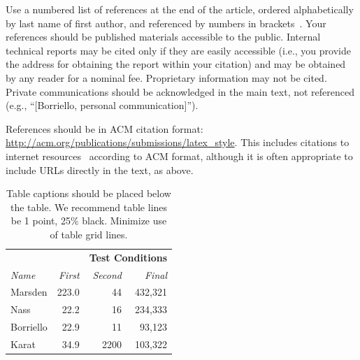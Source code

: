 \documentclass{sigchi}
\begin{document}
Use a numbered list of references at the end of the article, ordered
alphabetically by last name of first author, and referenced by numbers
in
brackets~\cite{Han:2005}.
Your references should be published materials accessible to the
public. Internal technical reports may be cited only if they are
easily accessible (i.e., you provide the address for obtaining the
report within your citation) and may be obtained by any reader for a
nominal fee. Proprietary information may not be cited. Private
communications should be acknowledged in the main text, not referenced
(e.g., ``[Borriello, personal communication]'').

References should be in ACM citation format:
\url{http://acm.org/publications/submissions/latex_style}. This
includes citations to internet
resources~\cite{Han:2005}
according to ACM format, although it is often appropriate to include
URLs directly in the text, as above.




\begin{table}
  \centering
  \begin{tabular}{l r r r}
    & & \multicolumn{2}{c}{\small{\textbf{Test Conditions}}} \\
    \cmidrule(r){3-4}
    {\small\textit{Name}}
    & {\small \textit{First}}
      & {\small \textit{Second}}
    & {\small \textit{Final}} \\
    \midrule
    Marsden & 223.0 & 44 & 432,321 \\
    Nass & 22.2 & 16 & 234,333 \\
    Borriello & 22.9 & 11 & 93,123 \\
    Karat & 34.9 & 2200 & 103,322 \\
  \end{tabular}
  \caption{Table captions should be placed below the table. We
    recommend table lines be 1 point, 25\% black. Minimize use of
    table grid lines.}~\label{tab:table1}
\end{table}
\end{document}
